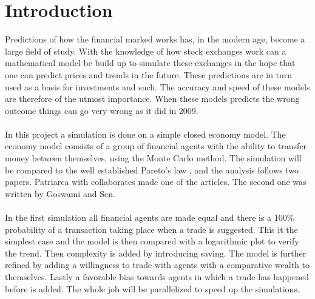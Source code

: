 \section{Introduction}

Predictions of how the financial marked works has, in the modern age, become a large field of study\cite{publisher}. With the knowledge of how stock exchanges work can a mathematical model be build up to simulate these exchanges in the hope that one can predict prices and trends in the future. These predictions are in turn used as a basis for investments and such. The accuracy and speed of these models are therefore of the utmost importance. When these models predicts the wrong outcome things can go very wrong as it did in 2009\cite{marketcrash}.
\\
\\
In this project a simulation is done on a simple closed economy model. The economy model consists of a group of financial agents with the ability to transfer money between themselves, using the Monte Carlo method. The simulation will be compared to the well established Pareto's law \cite{paretoslaw}, and the analysis follows two papers. Patriarca with collaborates made one of the articles.\cite{patriarca} The second one was written by Goswami and Sen. \cite{goswami}
\\
\\
In the first simulation all financial agents are made equal and there is a $100\%$ probability of a transaction taking place when a trade is suggested. This it the simplest case and the model is then compared with a logarithmic plot to verify the trend. Then complexity is added by introducing saving. The model is further refined by adding a willingness to trade with agents with a comparative wealth to themselves. Lastly a favorable bias towards agents in which a trade has happened before is added. The whole job will be parallelized to speed up the simulations.\\

















































